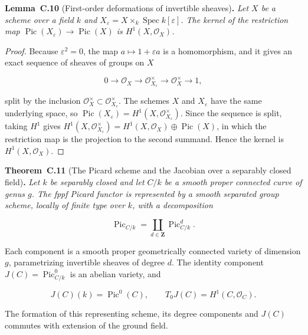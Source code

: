 \documentclass[11pt]{article}
\newenvironment{bpstatement}[2]{\par\addvspace{0.6\baselineskip}\noindent\textbf{#1}#2\textbf{.}\enspace\ignorespaces}
  {\par\addvspace{0.4\baselineskip}}
\newenvironment{bpstatementit}[2]{\begin{bpstatement}{#1}{#2}\itshape\ignorespaces}{\end{bpstatement}}
\begin{document}
\label{bp152}%
\begin{bpstatementit}{Lemma~C.10}{ (First-order deformations of invertible sheaves)}
Let \(X\) be a scheme over a field \(k\) and \(X_\varepsilon=X\times_k\operatorname{Spec}k[\varepsilon]\). The kernel of the restriction map \(\operatorname{Pic}(X_\varepsilon)\to\operatorname{Pic}(X)\) is \(H^1(X,\mathcal O_X)\).
\end{bpstatementit}

\begin{proof}[{Proof}]\label{bp153}%
Because \(\varepsilon^2=0\), the map \(a\mapsto1+\varepsilon a\) is a homomorphism, and it gives an exact sequence of sheaves of groups on \(X\)

\[
0\longrightarrow\mathcal O_X\longrightarrow
\mathcal O_{X_\varepsilon}^\times\longrightarrow\mathcal O_X^\times
\longrightarrow1,
\]

split by the inclusion \(\mathcal O_X^\times\subset
\mathcal O_{X_\varepsilon}^\times\). The schemes \(X\) and \(X_\varepsilon\) have the same underlying space, so \(\operatorname{Pic}(X_\varepsilon)=H^1(X,\mathcal O_{X_\varepsilon}^\times)\). Since the sequence is split, taking \(H^1\) gives \(H^1(X,\mathcal O_{X_\varepsilon}^\times)=H^1(X,\mathcal O_X)\oplus\operatorname{Pic}(X)\), in which the restriction map is the projection to the second summand. Hence the kernel is \(H^1(X,\mathcal O_X)\).
\end{proof}

\label{bp154}%
\begin{bpstatementit}{Theorem~C.11}{ (The Picard scheme and the Jacobian over a separably closed field)}
Let \(k\) be separably closed and let \(C/k\) be a smooth proper connected curve of genus \(g\). The fppf Picard functor is represented by a smooth separated group scheme, locally of finite type over \(k\), with a decomposition

\[
\operatorname{Pic}_{C/k}
=\coprod_{d\in\mathbf Z}\operatorname{Pic}^d_{C/k}.
\]

Each component is a smooth proper geometrically connected variety of dimension \(g\), parametrizing invertible sheaves of degree \(d\). The identity component \(J(C)=\operatorname{Pic}^0_{C/k}\) is an abelian variety, and

\[
J(C)(k)=\operatorname{Pic}^0(C),
\qquad T_0J(C)=H^1(C,\mathcal O_C).
\]

The formation of this representing scheme, its degree components and \(J(C)\) commutes with extension of the ground field.
\end{bpstatementit}
\end{document}
